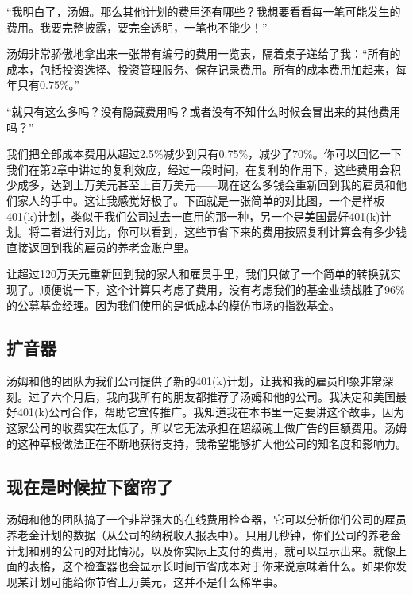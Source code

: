 “我明白了，汤姆。那么其他计划的费用还有哪些？我想要看看每一笔可能发生的费用。我要完整披露，要完全透明，一笔也不能少！”

汤姆非常骄傲地拿出来一张带有编号的费用一览表，隔着桌子递给了我：“所有的成本，包括投资选择、投资管理服务、保存记录费用。所有的成本费用加起来，每年只有0.75\%。”

“就只有这么多吗？没有隐藏费用吗？或者没有不知什么时候会冒出来的其他费用吗？”

我们把全部成本费用从超过2.5\%减少到只有0.75\%，减少了70\%。你可以回忆一下我们在第2章中讲过的复利效应，经过一段时间，在复利的作用下，这些费用会积少成多，达到上万美元甚至上百万美元——现在这么多钱会重新回到我的雇员和他们家人的手中。这让我感觉好极了。下面就是一张简单的对比图，一个是样板401(k)计划，类似于我们公司过去一直用的那一种，另一个是美国最好401(k)计划。将二者进行对比，你可以看到，这些节省下来的费用按照复利计算会有多少钱直接返回到我的雇员的养老金账户里。





让超过120万美元重新回到我的家人和雇员手里，我们只做了一个简单的转换就实现了。顺便说一下，这个计算只考虑了费用，没有考虑我们的基金业绩战胜了96\%的公募基金经理。因为我们使用的是低成本的模仿市场的指数基金。

\subsection{扩音器}

汤姆和他的团队为我们公司提供了新的401(k)计划，让我和我的雇员印象非常深刻。过了六个月后，我向我所有的朋友都推荐了汤姆和他的公司。我决定和美国最好401(k)公司合作，帮助它宣传推广。我知道我在本书里一定要讲这个故事，因为这家公司的收费实在太低了，所以它无法承担在超级碗上做广告的巨额费用。汤姆的这种草根做法正在不断地获得支持，我希望能够扩大他公司的知名度和影响力。

\subsection{现在是时候拉下窗帘了}

汤姆和他的团队搞了一个非常强大的在线费用检查器，它可以分析你们公司的雇员养老金计划的数据（从公司的纳税收入报表中）。只用几秒钟，你们公司的养老金计划和别的公司的对比情况，以及你实际上支付的费用，就可以显示出来。就像上面的表格，这个检查器也会显示长时间节省成本对于你来说意味着什么。如果你发现某计划可能给你节省上万美元，这并不是什么稀罕事。

